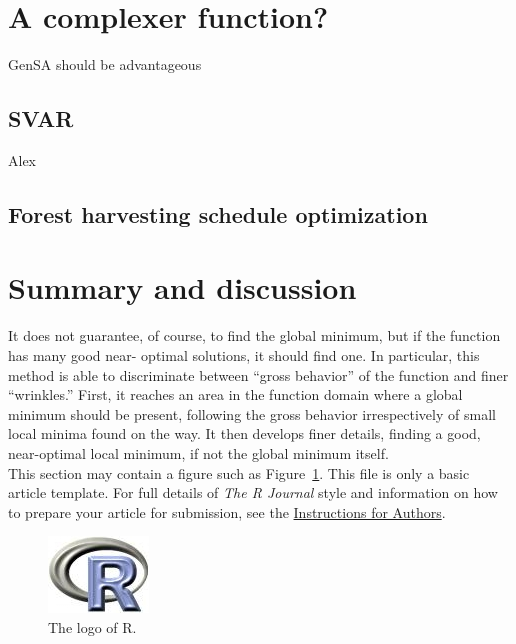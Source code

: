 \section{A complexer function?}
GenSA should be advantageous
\subsection{SVAR}
Alex
\subsection{Forest harvesting schedule optimization}
\section{Summary and discussion}
It does not guarantee, of course, to find the global minimum, but if the function has many good near- optimal solutions, it should find one. In particular, this method is able to discriminate between “gross behavior” of the function and finer “wrinkles.” First, it reaches an area in the function domain where a global minimum should be present, following the gross behavior irrespectively of small local minima found on the way. It then develops finer details, finding a good, near-optimal local minimum, if not the global minimum itself.\\

This section may contain a figure such as Figure~\ref{figure:rlogo}.
This file is only a basic article template. For full details of \emph{The R Journal} style and information on how to prepare your article for submission, see the \href{http://journal.r-project.org/share/author-guide.pdf}{Instructions for Authors}.

\begin{figure}[htbp]
	\centering
	\includegraphics{Fig/Rlogo}
	\caption{The logo of R.}
	\label{figure:rlogo}
\end{figure}



\address{Author One\\
  Affiliation\\
  Address\\
  Country\\}

\address{Author Two\\
  Affiliation\\
  Address\\
  Country\\}

\address{Author Three\\
  Affiliation\\
  Address\\
  Country\\}
